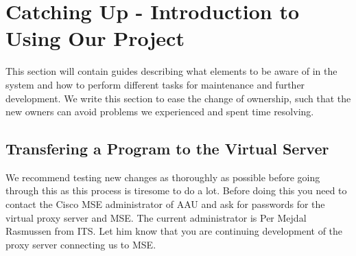 \section{Catching Up - Introduction to Using Our Project}\label{sec:catchup}
This section will contain guides describing what elements to be aware of in the system and how to perform different tasks for maintenance and further development. We write this section to ease the change of ownership, such that the new owners can avoid problems we experienced and spent time resolving. 

\subsection*{Transfering a Program to the Virtual Server}
We recommend testing new changes as thoroughly as possible before going through this as this process is tiresome to do a lot. Before doing this you need to contact the Cisco MSE administrator of AAU and ask for passwords for the virtual proxy server and MSE. The current administrator is Per Mejdal Rasmussen from ITS. Let him know that you are continuing development of the proxy server connecting us to MSE.

